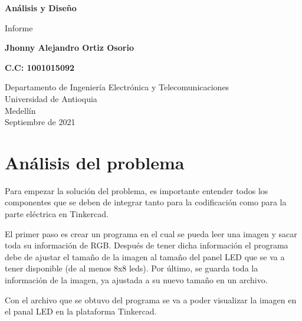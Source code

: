 \documentclass{article}
\begin{document}
\begin{titlepage}
    \begin{center}
        \vspace*{1cm} 
            
        \Huge
        \textbf{Análisis y Diseño}
            
        \vspace{0.5cm}
        \LARGE
        Informe 
            
        \vspace{1.5cm}
            
        \textbf{Jhonny Alejandro Ortiz Osorio}
        
        \textbf{C.C: 1001015092}
        
        \vfill
            
        \vspace{0.8cm}
            
        \Large
        Departamento de Ingeniería Electrónica y Telecomunicaciones\\
        Universidad de Antioquia\\
        Medellín\\
        Septiembre de 2021
            
    \end{center}
\end{titlepage}

\tableofcontents
\newpage
\section{Análisis del problema}\label{intro}
Para empezar la solución del problema, es importante entender todos los componentes que se deben de integrar tanto para la codificación como para la parte eléctrica en Tinkercad.

El primer paso es crear un programa en el cual se pueda leer una imagen y sacar toda su información de RGB. Después de tener dicha información el programa debe de ajustar el tamaño de la imagen al tamaño del panel LED que se va a tener disponible (de al menos 8x8 leds). Por último, se guarda toda la información de la imagen, ya ajustada a su nuevo tamaño en un archivo.

Con el archivo que se obtuvo del programa se va a poder visualizar la imagen en el panal LED en la plataforma Tinkercad.
\end{document}
